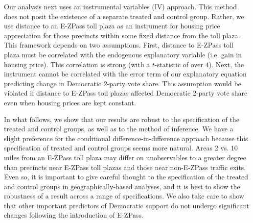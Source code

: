 Our analysis next uses an instrumental variables (IV) approach. This method does not posit the existence of a separate treated and control group. Rather, we use distance to an E-ZPass toll plaza as an instrument for housing price appreciation for those precincts within some fixed distance from the toll plaza. This framework depends on two assumptions. First, distance to E-ZPass toll plaza must be correlated with the endogenous explanatory variable (i.e. gain in housing price). This correlation is strong (with a $t$-statistic of over $4$). Next, the instrument cannot be correlated with the error term of our explanatory equation predicting change in Democratic $2$-party vote share. This assumption would be violated if distance to E-ZPass toll plazas affected Democratic $2$-party vote share even when housing prices are kept constant. 

In what follows, we show that our results are robust to the specification of the treated and control groups, as well as to the method of inference. We have a slight preference for the conditional difference-in-difference approach because this specification of treated and control groups seems more natural. Areas $2$ vs. $10$ miles from an E-ZPass toll plaza may differ on unobservables to a greater degree than precincts near E-ZPass toll plazas and those near non-E-ZPass traffic exits. Even so, it is important to give careful thought to the specification of the treated and control groups in geographically-based analyses, and it is best to show the robustness of a result across a range of specifications.  We also take care to show that other important predictors of Democratic support do not undergo significant changes following the introduction of E-ZPass. 